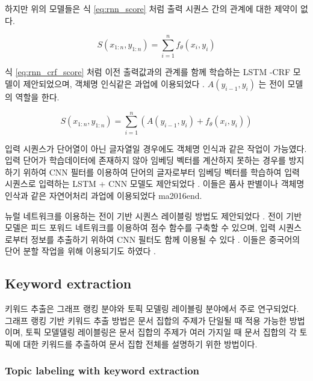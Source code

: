 \documentclass[11pt]{article}
\begin{document}
하지만 위의 모델들은 식 \ref{eq:rnn_score} 처럼 출력 시퀀스 간의 관계에 대한 제약이 없다.

\begin{equation}
  \label{eq:rnn_score}
  S(x_{1:n}, y_{1:n}) = \sum_{i=1}^n f_\theta(x_i, y_i)
\end{equation}

식 \ref{eq:rnn_crf_score} 처럼 이전 출력값과의 관계를 함께 학습하는 LSTM -CRF 모델이 제안되었으며, 객체명 인식같은 과업에 이용되었다 \citep{lample2016neural}.
$A(y_{i-1}, y_i)$ 는 전이 모델의 역할을 한다.

\begin{equation}
  \label{eq:rnn_crf_score}
  S(x_{1:n}, y_{1:n}) = \sum_{i=1}^n \left( A(y_{i-1}, y_i) + f_\theta(x_i, y_i) \right)
\end{equation}

입력 시퀀스가 단어열이 아닌 글자열일 경우에도 객체명 인식과 같은 작업이 가능였다\citep{gridach2017character}.
입력 단어가 학습데이터에 존재하지 않아 임베딩 벡터를 계산하지 못하는 경우를 방지하기 위하여 CNN 필터를 이용하여 단어의 글자로부터 임베딩 벡터를 학습하여 입력 시퀀스로 입력하는 LSTM + CNN 모델도 제안되었다 \citep{chiu2016named}.
이들은 품사 판별이나 객체명 인삭과 같은 자연어처리 과업에 이용되었다 {ma2016end}.

뉴럴 네트워크를 이용하는 전이 기반 시퀀스 레이블링 방법도 제안되었다 \citep{zheng2013deep, collobert2011natural, alberti2015improved}.
전이 기반 모델은 피드 포워드 네트워크를 이용하여 점수 함수를 구축할 수 있으며, 입력 시퀀스로부터 정보를 추출하기 위하여 CNN 필터도 함께 이용될 수 있다 \citep{collobert2011natural}.
이들은 중국어의 단어 분할 작업을 위해 이용되기도 하였다 \citep{zhang2016transition, cai2017fast, ballesteros2015improved}.


\subsection{Keyword extraction}

키워드 추출은 그래프 랭킹 분야와 토픽 모델링 레이블링 분야에서 주로 연구되었다.
그래프 랭킹 기반 키워드 추출 방법은 문서 집합의 주제가 단일될 때 적용 가능한 방법이며, 토픽 모델델링 레이블링은 문서 집합의 주제가 여러 가지일 때 문서 집합의 각 토픽에 대한 키워드를 추출하여 문서 집합 전체를 설명하기 위한 방법이다.

\subsubsection{Topic labeling with keyword extraction}
\end{document}
